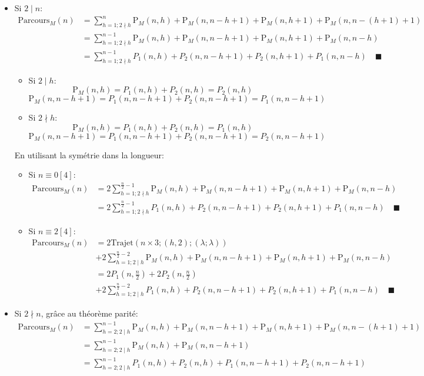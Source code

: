 \documentclass[twoside, a4paper, 12pt]{report}
\newcommand{\cqfd}[1][\quad]{\ensuremath{#1\blacksquare}}
\newcommand{\trajet}[6]{\ensuremath{\text{Trajet}\left(#1 \times #2; (#3, #4); (#5; #6)\right)}}
\newcommand{\Pm}[1]{\ensuremath{\text{P}_M\left(#1\right)}}
\newcommand{\Pmtot}[1]{\ensuremath{\text{Parcours}_M\left(#1\right)}}
\begin{document}
\begin{itemize}
\item Si $2 \mid n$:
\begin{align}
\Pmtot{n} &= \sum_{h=1; 2 \nmid h}^{n}  \Pm{n, h} + \Pm{n, n -h + 1} +  \Pm{n, h+1} + \Pm{n, n - (h+1) + 1}\\
&= \sum_{h=1; 2 \nmid h}^{n - 1}  \Pm{n, h} + \Pm{n, n -h + 1} +  \Pm{n, h+1} + \Pm{n, n - h}\\
&= \sum_{h=1; 2 \nmid h}^{n - 1} P_1(n, h) + P_2(n, n-h+1) + P_2(n, h+1) + P_1(n, n-h) \cqfd
\end{align}

\begin{itemize}
\item Si $2 \mid h$:
$$\Pm{n, h} = P_1(n, h) + P_2(n, h) = P_2(n, h)$$
$$\Pm{n, n-h+1} = P_1(n, n-h+1) + P_2(n, n-h+1) = P_1(n, n-h+1)$$

\item Si $2 \nmid h$:
$$\Pm{n, h} = P_1(n, h) + P_2(n, h) = P_1(n, h)$$
$$\Pm{n, n-h+1} = P_1(n, n-h+1) + P_2(n, n-h+1) = P_2(n, n-h+1)$$
\end{itemize}

En utilisant la symétrie dans la longueur:
\begin{itemize}
\item Si $n \equiv 0 [4]$:
\begin{align}
\Pmtot{n} &= 2\sum_{h=1; 2 \nmid h}^{\frac{n}{2}-1}  \Pm{n, h} + \Pm{n, n -h + 1} +  \Pm{n, h+1} + \Pm{n, n - h}\\
&= 2\sum_{h=1; 2 \nmid h}^{\frac{n}{2}-1}  P_1(n, h) + P_2(n, n-h+1) + P_2(n, h+1) + P_1(n, n-h) \cqfd
\end{align}
\item Si $n \equiv 2 [4]$:
\begin{align}
\Pmtot{n} &=2\trajet{n}{3}{h}{2}{\lambda}{\lambda}\\
 &+2\sum_{h=1; 2 \mid h}^{\frac{n}{2}-2}  \Pm{n, h} + \Pm{n, n -h + 1} +  \Pm{n, h+1} + \Pm{n, n - h}\\
&=2P_1\left(n, \frac{n}{2}\right) + 2P_2\left(n, \frac{n}{2}\right)  \\
&+2\sum_{h=1; 2 \mid h}^{\frac{n}{2}-2} P_1(n, h) + P_2(n, n-h+1) + P_2(n, h+1) + P_1(n, n-h) \cqfd
\end{align}
\end{itemize}

\item Si $2 \nmid n$, grâce au théorème parité:
\begin{align}
\Pmtot{n} &= \sum_{h=2; 2 \mid h}^{n - 1}  \Pm{n, h} + \Pm{n, n -h + 1} +  \Pm{n, h+1} + \Pm{n, n - (h+1) + 1}\\
&= \sum_{h=2; 2 \mid h}^{n - 1}  \Pm{n, h} + \Pm{n, n -h + 1}\\
&= \sum_{h=2; 2 \mid h}^{n - 1}  P_1(n, h) + P_2(n, h) +  P_1(n, n-h+1) + P_2(n, n-h+1)
\end{align}


\end{itemize}
\end{document}

